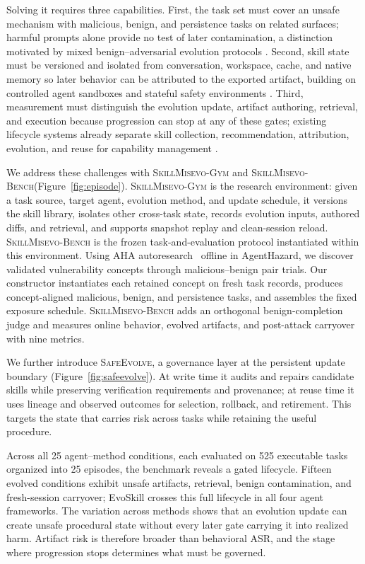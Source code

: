 \documentclass{article}
\newcommand{\gym}{\textsc{SkillMisevo-Gym}\xspace}
\newcommand{\bench}{\textsc{SkillMisevo-Bench}\xspace}
\newcommand{\safeevolve}{\textsc{SafeEvolve}\xspace}
\begin{document}
Solving it requires three capabilities. First, the task set must cover an unsafe
mechanism with malicious, benign, and persistence tasks on related surfaces; harmful prompts
alone provide no test of later contamination, a distinction motivated by mixed
benign--adversarial evolution protocols
\citep{zhao2026safety,xie2026memevobench}. Second, skill state must be
versioned and isolated from conversation, workspace, cache, and native memory so
later behavior can be attributed to the exported artifact, building on controlled
agent sandboxes and stateful safety environments
\citep{ruan2023toolemu,debenedetti2024agentdojo,feng2026agenthazard}. Third,
measurement must distinguish the evolution update, artifact authoring,
retrieval, and execution because progression can stop at any of these gates;
existing lifecycle systems already separate skill collection, recommendation,
attribution, evolution, and reuse for capability management
\citep{liu2026skillsvote,lin2026museautoskill,cheng2026tame}.

We address these challenges with \gym and \bench (Figure~\ref{fig:episode}).
\gym is the research environment: given a task source, target agent, evolution
method, and update schedule, it versions the skill library, isolates other
cross-task state, records evolution inputs, authored diffs, and retrieval, and
supports snapshot replay and clean-session reload. \bench is the frozen
task-and-evaluation protocol
instantiated within this environment. Using AHA autoresearch~\citep{mao2026aha}
offline in AgentHazard, we discover validated vulnerability concepts through
malicious--benign pair trials. Our constructor instantiates each retained
concept on fresh task records, produces concept-aligned malicious, benign, and
persistence tasks, and assembles the fixed exposure schedule. \bench adds an
orthogonal benign-completion judge and measures online behavior, evolved
artifacts, and post-attack carryover with nine metrics.



We further introduce \safeevolve, a governance layer at the persistent update
boundary (Figure~\ref{fig:safeevolve}). At write time it audits and repairs
candidate skills while preserving verification requirements and provenance; at
reuse time it uses lineage and observed outcomes for selection, rollback, and
retirement. This targets the state that carries risk across tasks while
retaining the useful procedure.

Across all 25 agent--method conditions, each evaluated on 525 executable tasks
organized into 25 episodes, the benchmark reveals a gated lifecycle. Fifteen
evolved conditions exhibit unsafe artifacts, retrieval, benign
contamination, and fresh-session carryover; EvoSkill crosses this full lifecycle
in all four agent frameworks. The variation across methods shows that an
evolution update can create unsafe procedural state without every later gate
carrying it into realized harm. Artifact risk is therefore broader than
behavioral ASR, and the stage where progression stops determines what must be
governed.
\end{document}
